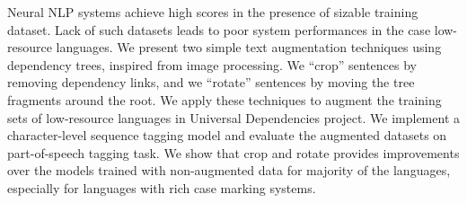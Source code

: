 Neural NLP systems achieve high scores in the presence of sizable training dataset. Lack of such datasets leads to poor system performances in the case low-resource languages. We present two simple text augmentation techniques using dependency trees, inspired from image processing. We ``crop'' sentences by removing dependency links, and we ``rotate'' sentences by moving the tree fragments around the root. We apply these techniques to augment the training sets of low-resource languages in Universal Dependencies project. We implement a character-level sequence tagging model and evaluate the augmented datasets on part-of-speech tagging task. We show that crop and rotate provides improvements over the models trained with non-augmented data for majority of the languages, especially for languages with rich case marking systems.
